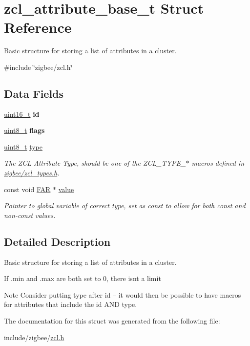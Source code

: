 \hypertarget{structzcl__attribute__base__t}{}\section{zcl\+\_\+attribute\+\_\+base\+\_\+t Struct Reference}
\label{structzcl__attribute__base__t}


Basic structure for storing a list of attributes in a cluster.  




{\ttfamily \#include \char`\"{}zigbee/zcl.\+h\char`\"{}}

\subsection*{Data Fields}
\begin{DoxyCompactItemize}
\item 
\hyperlink{group__hal__dos_ga5a8b2dc9e45a9ee81a94ef304fb62505}{uint16\+\_\+t} {\bfseries id}
\item 
\hyperlink{group__hal__dos_gae1affc9ca37cfb624959c866a73f83c2}{uint8\+\_\+t} {\bfseries flags}
\item 
\hyperlink{group__hal__dos_gae1affc9ca37cfb624959c866a73f83c2}{uint8\+\_\+t} \hyperlink{group__zcl_ga1d127017fb298b889f4ba24752d08b8e}{type}
\begin{DoxyCompactList}\small\item\em The Z\+CL Attribute Type, should be one of the Z\+C\+L\+\_\+\+T\+Y\+P\+E\+\_\+$\ast$ macros defined in \hyperlink{zcl__types_8h}{zigbee/zcl\+\_\+types.\+h}. \end{DoxyCompactList}\item 
const void \hyperlink{group__hal_gaef060b3456fdcc093a7210a762d5f2ed}{F\+AR} $\ast$ \hyperlink{group__zcl_gaaaa0b89997c57cfca2dfae40f46e702d}{value}
\begin{DoxyCompactList}\small\item\em Pointer to global variable of correct type, set as {\ttfamily const} to allow for both const and non-\/const values. \end{DoxyCompactList}\end{DoxyCompactItemize}


\subsection{Detailed Description}
Basic structure for storing a list of attributes in a cluster. 

If .min and .max are both set to 0, there isn\textquotesingle{}t a limit

\begin{DoxyNote}{Note}
Consider putting type after id -- it would then be possible to have macros for attributes that include the id A\+ND type. 
\end{DoxyNote}


The documentation for this struct was generated from the following file\+:\begin{DoxyCompactItemize}
\item 
include/zigbee/\hyperlink{zcl_8h}{zcl.\+h}\end{DoxyCompactItemize}
